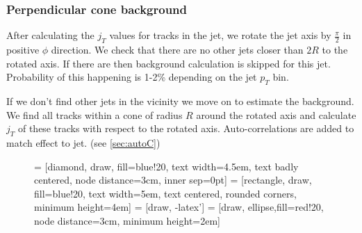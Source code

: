 \subsubsection{Perpendicular cone background}
After calculating the $j_T$ values for tracks in the jet, we rotate the jet axis by $\frac{\pi}{2}$ in positive $\phi$ direction. We check that there are no other jets closer than $2R$ to the rotated axis. If there are then background calculation is skipped for this jet. Probability of this happening is 1-2\% depending on the jet $p_T$ bin.

If we don't find other jets in the vicinity we move on to estimate the background. We find all tracks within a cone of radius $R$ around the rotated axis and calculate $j_T$ of these tracks with respect to the rotated axis. Auto-correlations are added to match effect to jet. (see \ref{sec:autoC})

\begin{figure}[htp]
 = [diamond, draw, fill=blue!20, 
    text width=4.5em, text badly centered, node distance=3cm, inner sep=0pt]
 = [rectangle, draw, fill=blue!20, 
    text width=5em, text centered, rounded corners, minimum height=4em]
 = [draw, -latex']
 = [draw, ellipse,fill=red!20, node distance=3cm,
    minimum height=2em]
    
\tiny 
{}
\end{figure}

